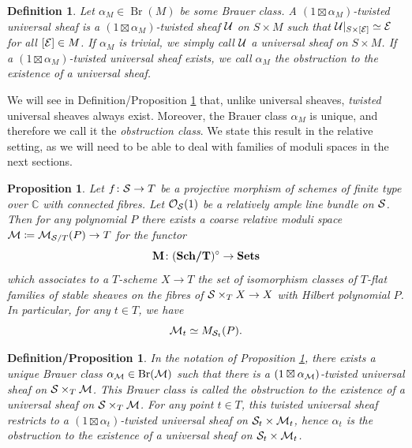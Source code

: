 \documentclass[11pt,twoside]{amsart}
\numberwithin{equation}{section}
\newtheorem{definition}[dummy]{Definition}
\newtheorem{proposition}[dummy]{Proposition}
\theoremstyle{definition}
\theoremstyle{plain}
\newtheorem{defprop}[dummy]{Definition/Proposition}
\newcommand{\CC}{\ensuremath{\mathbb{C}}}
\newcommand{\bigo}{\ensuremath{\mathcal{O}}}
\newcommand{\catname}[1]{{\normalfont\textbf{#1}}}
\def\Br{\operatorname{Br}}
\begin{document}
\begin{definition}
    Let $\alpha_M\in \Br(M)$ be some Brauer class. A $(1\boxtimes\alpha_M)$-twisted universal sheaf is a $(1\boxtimes \alpha_M)$-twisted sheaf $\mathcal{U}$ on $S\times M$ such that $\mathcal{U}|_{S\times [\mathcal{E}]}\simeq \mathcal{E}$ for all $[\mathcal{E}]\in M$. If $\alpha_M$ is trivial, we simply call $\mathcal{U}$ a universal sheaf on $S\times M$. If a $(1\boxtimes\alpha_M)$-twisted universal sheaf exists, we call $\alpha_M$ the obstruction to the existence of a universal sheaf.
\end{definition}

We will see in Definition/Proposition \ref{defprop:universaltwistedsheaves} that, unlike universal sheaves, \textit{twisted} universal sheaves always exist. Moreover, the Brauer class $\alpha_M$ is unique, and therefore we call it the \textit{obstruction class}. We state this result in the relative setting, as we will need to be able to deal with families of moduli spaces in the next sections.

\begin{proposition}\cite{HL10}
\label{prop:relativetwistedmodulispaces}
    Let $f\colon  \mathcal{S}\to T$ be a projective morphism of schemes of finite type over $\CC$ with connected fibres. Let $\bigo_{\calS}(1)$ be a relatively ample line bundle on $\mathcal{S}$.  Then for any polynomial $P$ there exists a coarse relative moduli space $\mathcal{M}\coloneqq \mathcal{M}_{\mathcal{S}/T}(P)\to T$ for the functor $$\catname{M}\colon  (\catname{Sch/T})^\circ\to \catname{Sets}$$
    which associates to a $T$-scheme $X\to T$ the set of isomorphism classes of $T$-flat families of stable sheaves on the fibres of $\mathcal{S}\times_TX\to X$ with Hilbert polynomial $P$. In particular, for any $t\in T$, we have $$\mathcal{M}_t\simeq M_{\mathcal{S}_t}(P).$$ 
\end{proposition}


\begin{defprop}\cite[Proposition 3.3.2]{Cal00}
\label{defprop:universaltwistedsheaves}
    In the notation of Proposition \ref{prop:relativetwistedmodulispaces}, there exists a unique Brauer class $\alpha_\calM\in \Br(\calM)$ such that there is a $(1\boxtimes\alpha_{\mathcal{M}})$-twisted universal sheaf on $\mathcal{S}\times_T\mathcal{M}$. This Brauer class is called the obstruction to the existence of a universal sheaf on $\mathcal{S}\times_T\mathcal{M}$. For any point $t\in T$, this twisted universal sheaf restricts to a $(1\boxtimes \alpha_t)$-twisted universal sheaf on $\mathcal{S}_t\times\mathcal{M}_t$, hence $\alpha_t$ is the obstruction to the existence of a universal sheaf on $\mathcal{S}_t\times\mathcal{M}_t$.
\end{defprop}
\end{document}
